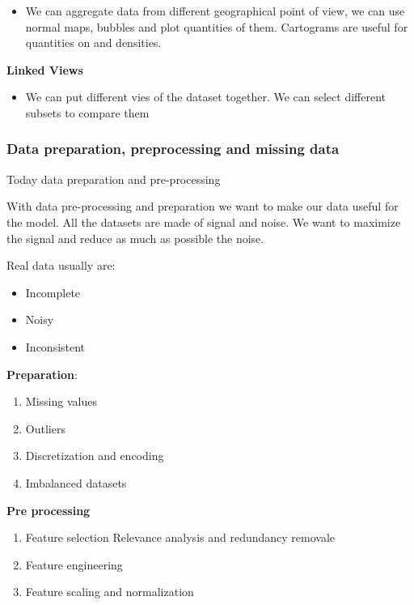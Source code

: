 \begin{itemize}
    \item We can aggregate data from different geographical point of view, we can use normal maps, bubbles and plot quantities of them. Cartograms are useful for quantities on and densities.
\end{itemize}

\vspace{10pt}

\textbf{Linked Views}

\begin{itemize}
    \item We can put different vies of the dataset together. We can select different subsets to compare them
\end{itemize}

\subsubsection{Data preparation, preprocessing and missing data}

Today data preparation and pre-processing

\vspace{10pt}

With data pre-processing and preparation we want to make our data useful for the model. All the datasets are made of signal and noise. We want to maximize the signal and reduce as much as possible the noise.

Real data usually are:
\begin{itemize}
    \item Incomplete
    \item Noisy
    \item Inconsistent
\end{itemize}

\vspace{10pt}


\textbf{Preparation}:
\begin{enumerate}
    \item Missing values
    \item Outliers
    \item Discretization and encoding
    \item Imbalanced datasets
\end{enumerate}

\textbf{Pre processing}

\begin{enumerate}
    \item Feature selection \ra Relevance analysis and redundancy removale
    \item Feature engineering
    \item Feature scaling and normalization
\end{enumerate}


